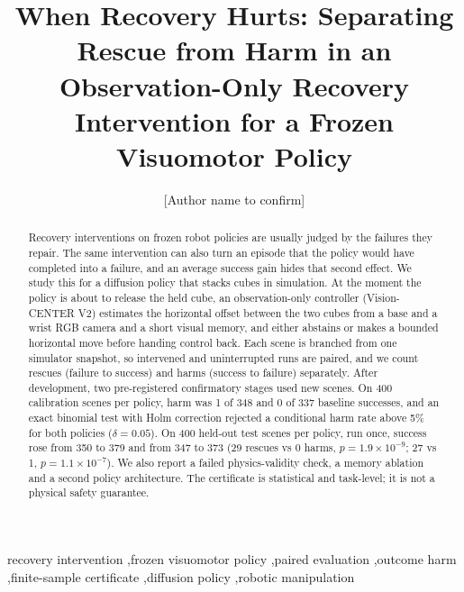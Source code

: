 \documentclass[preprint,12pt]{elsarticle}
\begin{document}
\begin{frontmatter}

\title{When Recovery Hurts: Separating Rescue from Harm in an Observation-Only Recovery Intervention for a Frozen Visuomotor Policy}

\author[1]{[Author name to confirm]}

\begin{abstract}
Recovery interventions on frozen robot policies are usually judged by the failures they repair. The same intervention can also turn an episode that the policy would have completed into a failure, and an average success gain hides that second effect. We study this for a diffusion policy that stacks cubes in simulation. At the moment the policy is about to release the held cube, an observation-only controller (Vision-CENTER V2) estimates the horizontal offset between the two cubes from a base and a wrist RGB camera and a short visual memory, and either abstains or makes a bounded horizontal move before handing control back. Each scene is branched from one simulator snapshot, so intervened and uninterrupted runs are paired, and we count rescues (failure to success) and harms (success to failure) separately. After development, two pre-registered confirmatory stages used new scenes. On 400 calibration scenes per policy, harm was 1 of 348 and 0 of 337 baseline successes, and an exact binomial test with Holm correction rejected a conditional harm rate above 5\% for both policies ($\delta=0.05$). On 400 held-out test scenes per policy, run once, success rose from 350 to 379 and from 347 to 373 (29 rescues vs 0 harms, $p=1.9\times10^{-9}$; 27 vs 1, $p=1.1\times10^{-7}$). We also report a failed physics-validity check, a memory ablation and a second policy architecture. The certificate is statistical and task-level; it is not a physical safety guarantee.
\end{abstract}

\begin{keyword}
recovery intervention \sep frozen visuomotor policy \sep paired evaluation \sep outcome harm \sep finite-sample certificate \sep diffusion policy \sep robotic manipulation
\end{keyword}

\end{frontmatter}
\end{document}
